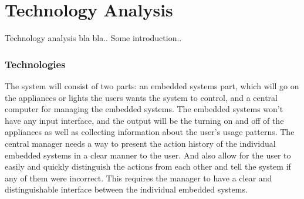 \chapter{Technology Analysis}
\label{chap:Technology Analysis}
Technology analysis bla bla.. Some introduction..
\subsection{Technologies}
\label{sub:Technologies}
The system will consist of two parts: an embedded systems part, which will go on
the appliances or lights the users wants the system to control, and a central
computer for managing the embedded systems. The embedded systems won't have any
input interface, and the output will be the turning on and off of the appliances
as well as collecting information about the user's usage patterns.
The central manager needs a way to present the action history of the individual embedded systems in a clear manner to the user.
And also allow for the user to easily and quickly distinguish the actions from each other and tell the system if any of them were incorrect.
This requires the manager to have a clear and distinguishable interface between the individual embedded systems.
